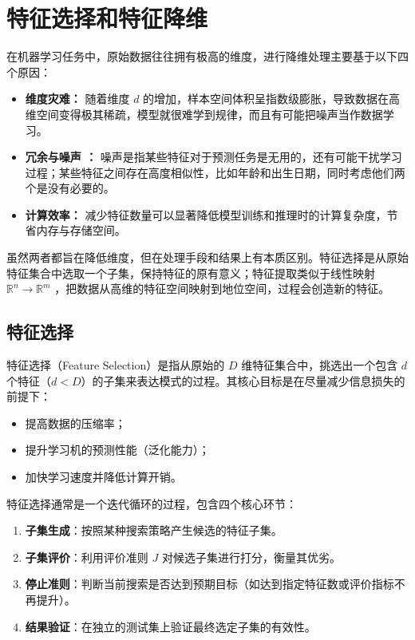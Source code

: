\section{特征选择和特征降维}
在机器学习任务中，原始数据往往拥有极高的维度，进行降维处理主要基于以下四个原因：
\begin{itemize}
    \item \textbf{维度灾难：} 随着维度 $d$ 的增加，样本空间体积呈指数级膨胀，导致数据在高维空间变得极其稀疏，模型就很难学到规律，而且有可能把噪声当作数据学习。
    \item \textbf{冗余与噪声 ：} 噪声是指某些特征对于预测任务是无用的，还有可能干扰学习过程；某些特征之间存在高度相似性，比如年龄和出生日期，同时考虑他们两个是没有必要的。
    \item \textbf{计算效率：} 减少特征数量可以显著降低模型训练和推理时的计算复杂度，节省内存与存储空间。
\end{itemize}

虽然两者都旨在降低维度，但在处理手段和结果上有本质区别。特征选择是从原始特征集合中选取一个子集，保持特征的原有意义；特征提取类似于线性映射$\mathbb{R}^n \rightarrow \mathbb{R}^m$
，把数据从高维的特征空间映射到地位空间，过程会创造新的特征。

\subsection{特征选择}
\begin{definition}[特征选择问题]
    特征选择（Feature Selection）是指从原始的 $D$ 维特征集合中，挑选出一个包含 $d$ 个特征（$d < D$）的子集来表达模式的过程。其核心目标是在尽量减少信息损失的前提下：
    \begin{itemize}
        \item 提高数据的压缩率；
        \item 提升学习机的预测性能（泛化能力）；
        \item 加快学习速度并降低计算开销。
    \end{itemize}
\end{definition}

特征选择通常是一个迭代循环的过程，包含四个核心环节：
\begin{enumerate}
    \item \textbf{子集生成}：按照某种搜索策略产生候选的特征子集。
    \item \textbf{子集评价}：利用评价准则 $J$ 对候选子集进行打分，衡量其优劣。
    \item \textbf{停止准则}：判断当前搜索是否达到预期目标（如达到指定特征数或评价指标不再提升）。
    \item \textbf{结果验证}：在独立的测试集上验证最终选定子集的有效性。
\end{enumerate}

